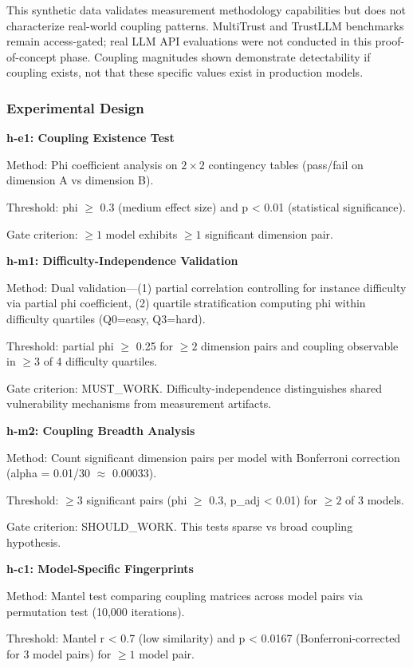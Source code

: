 This synthetic data validates measurement methodology capabilities but does not characterize real-world coupling patterns. MultiTrust and TrustLLM benchmarks remain access-gated; real LLM API evaluations were not conducted in this proof-of-concept phase. Coupling magnitudes shown demonstrate detectability if coupling exists, not that these specific values exist in production models.

\subsubsection{Experimental Design}

\textbf{h-e1: Coupling Existence Test}

Method: Phi coefficient analysis on $2\times 2$ contingency tables (pass/fail on dimension A vs dimension B).

Threshold: phi $\geq$ 0.3 (medium effect size) and p < 0.01 (statistical significance).

Gate criterion: $\geq 1$ model exhibits $\geq 1$ significant dimension pair.

\textbf{h-m1: Difficulty-Independence Validation}

Method: Dual validation---(1) partial correlation controlling for instance difficulty via partial phi coefficient, (2) quartile stratification computing phi within difficulty quartiles (Q0=easy, Q3=hard).

Threshold: partial phi $\geq$ 0.25 for $\geq 2$ dimension pairs and coupling observable in $\geq 3$ of 4 difficulty quartiles.

Gate criterion: MUST\_WORK. Difficulty-independence distinguishes shared vulnerability mechanisms from measurement artifacts.

\textbf{h-m2: Coupling Breadth Analysis}

Method: Count significant dimension pairs per model with Bonferroni correction (alpha = 0.01/30 $\approx$ 0.00033).

Threshold: $\geq 3$ significant pairs (phi $\geq$ 0.3, p\_adj < 0.01) for $\geq 2$ of 3 models.

Gate criterion: SHOULD\_WORK. This tests sparse vs broad coupling hypothesis.

\textbf{h-c1: Model-Specific Fingerprints}

Method: Mantel test comparing coupling matrices across model pairs via permutation test (10,000 iterations).

Threshold: Mantel r < 0.7 (low similarity) and p < 0.0167 (Bonferroni-corrected for 3 model pairs) for $\geq 1$ model pair.

